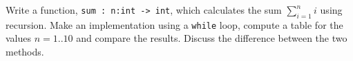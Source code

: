 Write a function, \lstinline{sum : n:int -> int}, which calculates the sum $\sum_{i=1}^ni$ using recursion. Make an implementation using a \lstinline!while! loop, compute a table for the values $n=1..10$ and compare the results. Discuss the difference between the two methods.